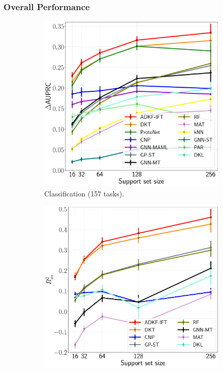         \subsubsection{Overall Performance}
        \begin{figure}
            \begin{subfigure}{.45\textwidth}
                \centering
                \includegraphics[width=\textwidth]{comparison_plot_hc_all.pdf}
                \caption{{\color{black}Classification (157 tasks).}}
            \end{subfigure}
            \hfill
            \begin{subfigure}{.45\textwidth}
                \centering
                \includegraphics[width=\textwidth]{comparison_plot_hc_all_numeric.pdf}

\end{subfigure}
\end{figure}
